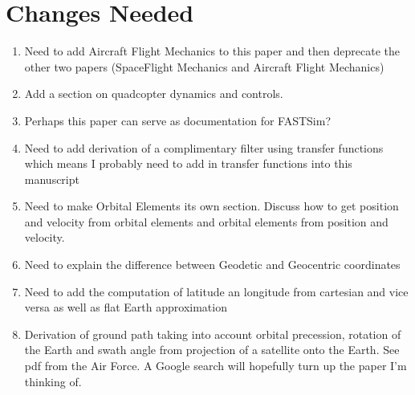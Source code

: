 \documentclass{article}
\begin{document}
\newpage

\section*{Changes Needed}

\begin{enumerate}[itemsep=-5pt]
\item Need to add Aircraft Flight Mechanics to this paper and then
  deprecate the other two papers (SpaceFlight Mechanics and Aircraft
  Flight Mechanics)
\item Add a section on quadcopter dynamics and controls.
\item Perhaps this paper can serve as documentation for FASTSim?
\item Need to add derivation of a complimentary filter using
  transfer functions which means I probably need to add in transfer
  functions into this manuscript
\item Need to make Orbital Elements its own section. Discuss how to
  get position and velocity from orbital elements and orbital elements
  from position and velocity.
\item Need to explain the difference between Geodetic and Geocentric
  coordinates
\item Need to add the computation of latitude an longitude from
  cartesian and vice versa as well as flat Earth approximation
\item Derivation of ground path taking into account orbital
  precession, rotation of the Earth and swath angle from projection of
  a satellite onto the Earth. See pdf from the Air Force. A Google
  search will hopefully turn up the paper I'm thinking of.
\end{enumerate}

\newpage

  

\tableofcontents
\end{document}
